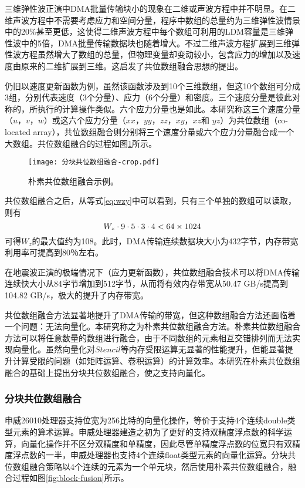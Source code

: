 三维弹性波正演中DMA批量传输块小的现象在二维或声波方程中并不明显。在二维声波方程中不需要考虑应力和空间分量，程序中数组的总量约为三维弹性波情景中的20\%甚至更低，这使得二维声波方程中每个数组可利用的LDM容量是三维弹性波中的5倍，DMA批量传输数据块也随着增大。不过二维声波方程扩展到三维弹性波方程虽然增大了数组的总量，但物理变量却变动较小，包含应力的增加以及速度由原来的二维扩展到三维。这启发了共位数组融合思想的提出。

仍旧以速度更新函数为例，虽然该函数涉及到10个三维数组，但这10个数组可分成3组，分别代表速度（3个分量）、应力（6个分量）和密度。三个速度分量是彼此对称的，所执行的计算操作类似。六个应力分量也是如此。本研究称这三个速度分量（$ u $，$ v $，$ w $）或这六个应力分量（$ xx $，$ yy $，$ zz $，$ xy $，$ xz $和 $ yz $）为共位数组（co-located array），共位数组融合则分别将三个速度分量或六个应力分量融合成一个大数组。共位数组融合的过程如图\ref{fig:naive-fusion}所示。

\begin{figure}[ht]
\centering
\texttt{[image: 分块共位数组融合-crop.pdf]}
\caption{朴素共位数组融合示例。}
\label{fig:naive-fusion}
\end{figure}

共位数组融合之后，从等式\ref{eq:wzy}中可以看到，只有三个单独的数组可以读取，则有
\begin{equation}
W_z \cdot 9 \cdot 5 \cdot 3 \cdot 4 < 64 \times 1024\\
\label{eq:wzy2}
\end{equation}
可得$ W_z $的最大值约为108。此时，DMA传输连续数据块大小为432字节，内存带宽利用率可提高到80％左右。 

在地震波正演的极端情况下（应力更新函数），共位数组融合技术可以将DMA传输连续快大小从84字节增加到512字节，从而将有效内存带宽从50.47 GB/s提高到104.82 GB/s，极大的提升了内存带宽。

共位数组融合方法显著地提升了DMA传输的带宽，但这种数组融合方法还面临着一个问题：无法向量化。本研究称之为朴素共位数组融合方法。朴素共位数组融合方法可以将任意数量的数组进行融合，由于不同数组的元素相互交错排列而无法实现向量化。虽然向量化对$Stencil$等内存受限运算无显著的性能提升，但能显著提升计算受限的问题（如矩阵运算、卷积运算）的计算效率。本研究在朴素共位数组融合的基础上提出分块共位数组融合，使之支持向量化。

\subsubsection{分块共位数组融合}

申威26010处理器支持位宽为256比特的向量化操作，等价于支持4个连续double类型元素的算术运算。申威处理器建造之初为了更好的支持双精度浮点数的科学运算，向量化操作并不区分双精度和单精度，因此尽管单精度浮点数的位宽只有双精度浮点数的一半，申威处理器也支持4个连续float类型元素的向量化运算。分块共位数组融合策略以4个连续的元素为一个单元块，然后使用朴素共位数组融合，融合过程如图\ref{fig:block-fusion}所示。


